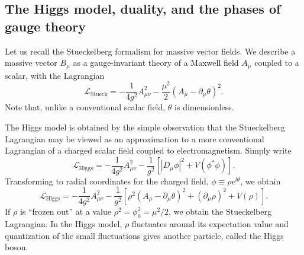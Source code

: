 \subsection{The Higgs model, duality, and the phases of gauge theory}

Let us recall the Stueckelberg formalism for massive vector fields. We describe
a massive vector $B_\mu$ as a gauge-invariant theory of a Maxwell field
$A_\mu$ coupled to a scalar, with the Lagrangian
\begin{equation*}
  \mathcal L_{\mathrm{Stueck}}
  =-\frac{1}{4g^2}A_{\mu\nu}^2
  -\frac{\mu^2}{2}(A_\mu-\partial_\mu\theta)^2.
\end{equation*}
Note that, unlike a conventional scalar field, $\theta$ is dimensionless.

The Higgs model is obtained by the simple observation that the Stueckelberg
Lagrangian may be viewed as an approximation to a more conventional Lagrangian
of a charged scalar field coupled to electromagnetism. Simply write
\begin{equation*}
  \mathcal L_{\mathrm{Higgs}}=-\frac{1}{4g^2}A_{\mu\nu}^2
  -\frac{1}{g^2}[|D_\mu\phi|^2+V(\phi^*\phi)].
\end{equation*}
Transforming to radial coordinates for the charged field,
$\phi\equiv\rho e^{\ii\theta}$, we obtain
\begin{equation*}
  \mathcal L_{\mathrm{Higgs}}=-\frac{1}{4g^2}A_{\mu\nu}^2
  -\frac{1}{g^2}[\rho^2(A_\mu-\partial_\mu\theta)^2
  +(\partial_\mu\rho)^2+V(\rho)].
\end{equation*}
If $\rho$ is ``frozen out'' at a value $\rho^2=\phi_0^2=\mu^2/2$, we obtain
the Stueckelberg Lagrangian. In the Higgs model, $\rho$ fluctuates around its
expectation value and quantization of the small fluctuations gives another
particle, called the Higgs boson.

